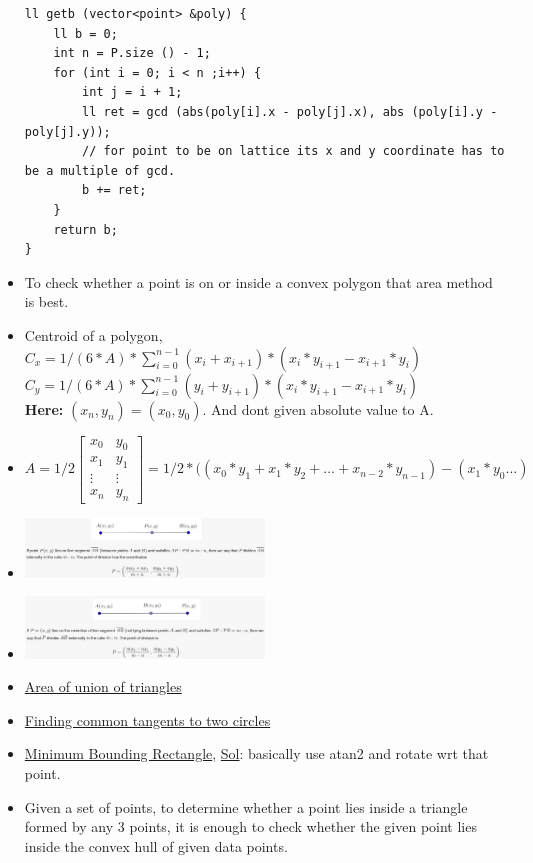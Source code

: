 \documentclass[8pt, a4paper, oneside, twocolumn]{extarticle}
\begin{document}
\begin{itemize}
\begin{verbatim}
ll getb (vector<point> &poly) {
    ll b = 0;
    int n = P.size () - 1;
    for (int i = 0; i < n ;i++) {
        int j = i + 1; 
        ll ret = gcd (abs(poly[i].x - poly[j].x), abs (poly[i].y - poly[j].y));
        // for point to be on lattice its x and y coordinate has to be a multiple of gcd.
        b += ret;
    }
    return b;
}
    \end{verbatim}
    \item To check whether a point is on or inside a convex polygon that area method is best.
    \item Centroid of a polygon, $C_x = 1/(6*A)*\sum_{i = 0}^{n - 1}(x_i + x_{i + 1}) * (x_i * y_{i + 1} - x_{i + 1} * y_i)$
    \\$C_y = 1/(6*A)*\sum_{i = 0}^{n - 1}(y_i + y_{i + 1}) * (x_i * y_{i + 1} - x_{i + 1} * y_i)$
    \\\textbf{Here: }$(x_n, y_n) = (x_0, y_0)$. And dont given absolute value to A.
    \item \[A = 1/2\begin{bmatrix}
    x_0 & y_0\\
    x_1 & y_1\\
    \vdots & \vdots\\
    x_n & y_n
    \end{bmatrix} = 1/2 * ((x_0 * y_1 + x_1 * y_2 + \dots + x_{n - 2} * y_{n - 1}) - (x_1*y_0 \dots)\]
    \item \includegraphics[width=0.5\textwidth,height=0.5\textheight,keepaspectratio]{p1} 
    \item \includegraphics[width=0.5\textwidth,height=0.5\textheight,keepaspectratio]{p2}
    \item \href{https://github.com/sourabh2311/Competitive-Programming/blob/master/Libs/areaOfUnionOfTriangles.cpp}{Area of union of triangles}
    \item \href{http://e-maxx.ru/algo/circle_tangents}{Finding common tangents to two circles}
    \item \href{https://uva.onlinejudge.org/external/101/10173.pdf}{Minimum Bounding Rectangle}, \href{https://github.com/sourabh2311/Competitive-Programming/blob/master/UVA_10173.cpp}{Sol}: basically use atan2 and rotate wrt that point.
    \item Given a set of points, to determine whether a point lies inside a triangle formed by any 3 points, it is enough to check whether the given point lies inside the convex hull of given data points.
\end{itemize}
\end{document}

